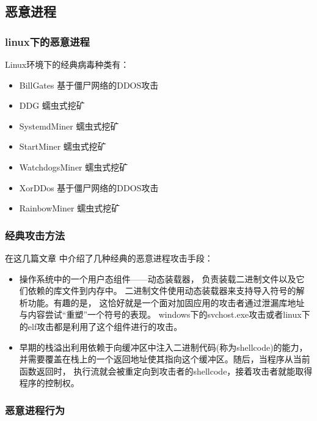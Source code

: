 \documentclass[AutoFakeBold,a4paper]{ctexart}
\begin{document}
\subsection{恶意进程}

\subsubsection{linux下的恶意进程}

Linux环境下的经典病毒种类有：\cite{LinuxVirus2020}

\begin{itemize}
    \item BillGates 基于僵尸网络的DDOS攻击
    \item DDG 蠕虫式挖矿
    \item SystemdMiner 蠕虫式挖矿
    \item StartMiner 蠕虫式挖矿
    \item WatchdogsMiner 蠕虫式挖矿
    \item XorDDos 基于僵尸网络的DDOS攻击
    \item RainbowMiner 蠕虫式挖矿
\end{itemize}


\subsubsection{经典攻击方法}

在这几篇文章\cite{di2015elf} \cite{rieck2008learning}中介绍了几种经典的恶意进程攻击手段：

\begin{itemize}
    \item 操作系统中的一个用户态组件——动态装载器，
    负责装载二进制文件以及它们依赖的库文件到内存中。
    二进制文件使用动态装载器来支持导入符号的解析功能。有趣的是，
    这恰好就是一个面对加固应用的攻击者通过泄漏库地址与内容尝试“重塑”一个符号的表现。
    windows下的svchost.exe攻击或者linux下的elf攻击都是利用了这个组件进行的攻击。
    \item 早期的栈溢出利用依赖于向缓冲区中注入二进制代码(称为shellcode)的能力，
    并需要覆盖在栈上的一个返回地址使其指向这个缓冲区。随后，当程序从当前函数返回时，
    执行流就会被重定向到攻击者的shellcode，接着攻击者就能取得程序的控制权。
    
\end{itemize}

\subsubsection{恶意进程行为}
\end{document}
